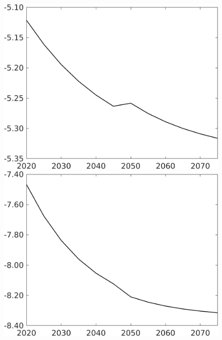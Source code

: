 \documentclass[12pt]{article}
\begin{document}
\begin{figure}[h!!]
\begin{minipage}[]{0.32\textwidth}
	\end{minipage}	
	\begin{minipage}[]{0.32\textwidth}
		\includegraphics[width=1\textwidth]{../../codding_model/own_basedOnFried/optimalPol_010922_revision/figures/all_13Sept22/CompTaufPER_bytaul_Equlab_Reg0_hl_spillover0_nsk0_xgr0_knspil1_sep1_LFlimit1_emsbase0_countec0_GovRev0_etaa0.79_lgd0.png}
	\end{minipage}	
	\begin{minipage}[]{0.32\textwidth}
		\includegraphics[width=1\textwidth]{../../codding_model/own_basedOnFried/optimalPol_010922_revision/figures/all_13Sept22/CompTaufPER_bytaul_Equlab_Reg0_C_spillover0_nsk0_xgr0_knspil1_sep1_LFlimit1_emsbase0_countec0_GovRev0_etaa0.79_lgd0.png}

\end{minipage}
\end{figure}
\end{document}

